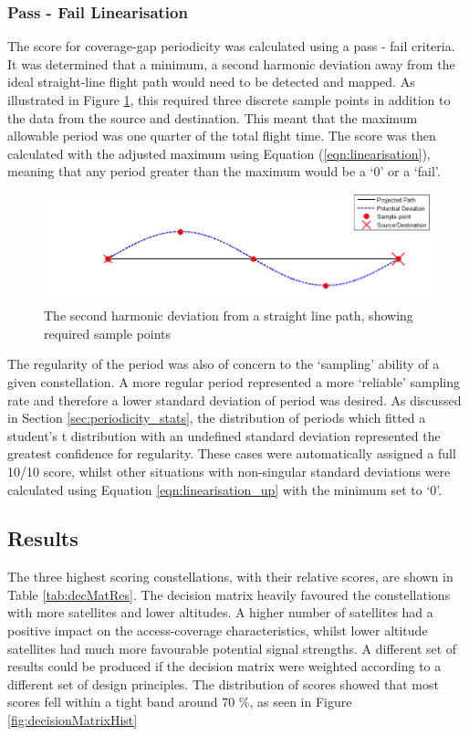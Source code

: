 \subsubsection{Pass - Fail Linearisation}
The score for coverage-gap periodicity was calculated using a pass - fail criteria. It was determined that a minimum, a second harmonic deviation away from the ideal straight-line flight path would need to be detected and mapped. As illustrated in Figure \ref{fig:2ndHarmonic}, this required three discrete sample points in addition to the data from the source and destination. This meant that the maximum allowable period was one quarter of the total flight time. The score was then calculated with the adjusted maximum using Equation (\ref{eqn:linearisation}), meaning that any period greater than the maximum would be a `0' or a `fail'.
\begin{figure}[H]
	\centering
	\includegraphics[scale = 0.75]{Pictures/2ndHarmonic.png}
	
	\caption{The second harmonic deviation from a straight line path, showing required sample points}
	\label{fig:2ndHarmonic}
\end{figure}
The regularity of the period was also of concern to the `sampling' ability of a given constellation. A more regular period represented a more `reliable' sampling rate and therefore a lower standard deviation of period was desired. As discussed in Section \ref{sec:periodicity_stats}, the distribution of periods which fitted a student's t distribution with an undefined standard deviation represented the greatest confidence for regularity. These cases were automatically assigned a full 10/10 score, whilst other situations with non-singular standard deviations were calculated using Equation \ref{eqn:linearisation_up} with the minimum set to `0'.

\subsection{Results}
The three highest scoring constellations, with their relative scores, are shown in Table \ref{tab:decMatRes}. The decision matrix heavily favoured the constellations with more satellites and lower altitudes. A higher number of satellites had a positive impact on the access-coverage characteristics, whilst lower altitude satellites had much more favourable potential signal strengths. A different set of results could be produced if the decision matrix were weighted according to a different set of design principles. The distribution of scores showed that most scores fell within a tight band around 70 \%, as seen in Figure \ref{fig:decisionMatrixHist}

